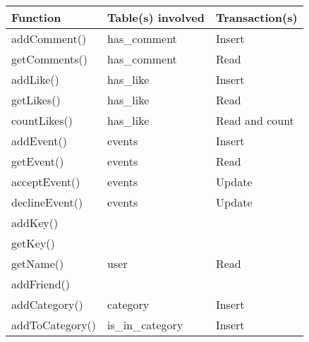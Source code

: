 \begin{center}
    \begin{tabular}{ | p{3cm} | p{5cm} | p{3cm} |}
    \hline
    {\bf Function}        & {\bf Table(s) involved} & {\bf Transaction(s)} \\ \hline
    addComment()    & has\_comment      &   Insert       \\ \hline 
    getComments()   & has\_comment      &  Read          \\ \hline 
    addLike()       & has\_like         &  Insert        \\ \hline 
    getLikes()      & has\_like         &  Read          \\ \hline 
    countLikes()    & has\_like         &  Read and count\\ \hline 
    addEvent()      & events            &    Insert      \\ \hline 
    getEvent()      & events            &  Read          \\ \hline 
    acceptEvent()   & events            &   Update       \\ \hline 
    declineEvent()  & events            &  Update        \\ \hline 
    addKey()        &                   &                \\ \hline 
    getKey()        &                   &                \\ \hline 
    getName()       & user              &  Read          \\ \hline 
    addFriend()     &                   &                \\ \hline 
    addCategory()   & category          &     Insert     \\ \hline  
    addToCategory() & is\_in\_category  &   Insert       \\ \hline 

    \end{tabular}
\end{center}
